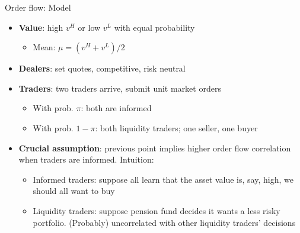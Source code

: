 \documentclass[english,10pt
,aspectratio=169
]{beamer}
\begin{document}
\begin{frame}{Order flow: Model}
	\begin{itemize}
		\item \textbf{Value}: high $v^H$ or low $v^L$ with equal probability
		\begin{itemize}
			\item Mean: $\mu=(v^H+v^L)/2$
		\end{itemize}
		\item \textbf{Dealers}: set quotes, competitive, risk neutral
		\item \textbf{Traders}: two traders arrive, submit unit market orders
		\begin{itemize}
			\item With prob. $\pi$: both are informed
			\item With prob. $1-\pi$: both liquidity traders;  one seller, one buyer
		\end{itemize}
		\item \textbf{Crucial assumption}: previous point implies higher order flow correlation  when traders are informed. Intuition: 
		\begin{itemize}
			\item Informed traders: suppose all learn that the asset value is, say, high, we should all want to buy
			\item Liquidity traders: suppose pension fund decides it wants a less risky portfolio. (Probably) uncorrelated with other liquidity traders' decisions
		\end{itemize}
	\end{itemize}
\end{frame}
\end{document}

